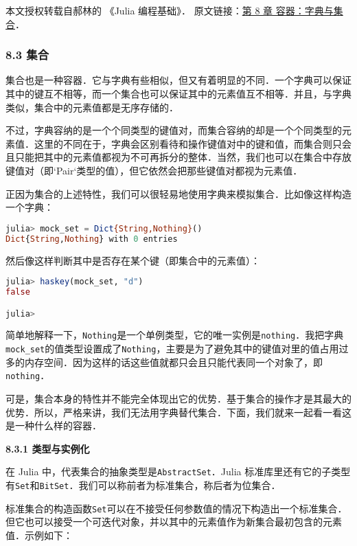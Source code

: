 
本文授权转载自郝林的 《Julia 编程基础》． 原文链接：\href{https://github.com/hyper0x/JuliaBasics/blob/master/book/ch08.md}{第 8 章 容器：字典与集合}．


\subsubsection{8.3 集合}

集合也是一种容器．它与字典有些相似，但又有着明显的不同．一个字典可以保证其中的键互不相等，而一个集合也可以保证其中的元素值互不相等．并且，与字典类似，集合中的元素值都是无序存储的．

不过，字典容纳的是一个个同类型的键值对，而集合容纳的却是一个个同类型的元素值．这里的不同在于，字典会区别看待和操作键值对中的键和值，而集合则只会且只能把其中的元素值都视为不可再拆分的整体．当然，我们也可以在集合中存放键值对（即`Pair`类型的值），但它依然会把那些键值对都视为元素值．

正因为集合的上述特性，我们可以很轻易地使用字典来模拟集合．比如像这样构造一个字典：

\begin{lstlisting}[language=julia]
julia> mock_set = Dict{String,Nothing}()
Dict{String,Nothing} with 0 entries
\end{lstlisting}

然后像这样判断其中是否存在某个键（即集合中的元素值）：

\begin{lstlisting}[language=julia]
julia> haskey(mock_set, "d")
false

julia> 
\end{lstlisting}

简单地解释一下，\verb|Nothing|是一个单例类型，它的唯一实例是\verb|nothing|．我把字典\verb|mock_set|的值类型设置成了\verb|Nothing|，主要是为了避免其中的键值对里的值占用过多的内存空间．因为这样的话这些值就都只会且只能代表同一个对象了，即\verb|nothing|．

可是，集合本身的特性并不能完全体现出它的优势．基于集合的操作才是其最大的优势．所以，严格来讲，我们无法用字典替代集合．下面，我们就来一起看一看这是一种什么样的容器．

\textbf{8.3.1 类型与实例化}

在 Julia 中，代表集合的抽象类型是\verb|AbstractSet|．Julia 标准库里还有它的子类型有\verb|Set|和\verb|BitSet|．我们可以称前者为标准集合，称后者为位集合．

标准集合的构造函数\verb|Set|可以在不接受任何参数值的情况下构造出一个标准集合．但它也可以接受一个可迭代对象，并以其中的元素值作为新集合最初包含的元素值．示例如下：

